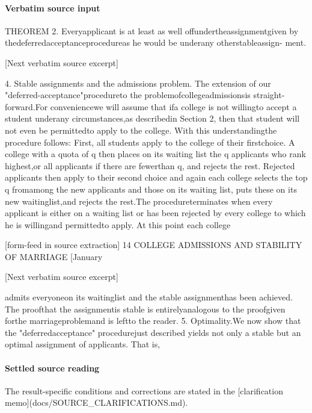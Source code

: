 \documentclass[10pt]{article}
\begin{document}
\paragraph{Verbatim source input}
\begin{ReviewVerbatim}
THEOREM 2. Everyapplicant is at least as well offundertheassignmentgiven
by thedeferredacceptanceprocedureas he would be underany otherstableassign-
ment.

[Next verbatim source excerpt]

    4. Stable assignments and the admissions problem. The extension of our
"deferred-acceptance"procedureto the problemofcollegeadmissionsis straight-
forward.For conveniencewe will assume that ifa college is not willingto accept
a student underany circumstances,as describedin Section 2, then that student
will not even be permittedto apply to the college. With this understandingthe
procedure follows: First, all students apply to the college of their firstchoice.
A college with a quota of q then places on its waiting list the q applicants who
rank highest,or all applicants if there are fewerthan q, and rejects the rest.
Rejected applicants then apply to their second choice and again each college
selects the top q fromamong the new applicants and those on its waiting list,
puts these on its new waitinglist,and rejects the rest.The procedureterminates
when every applicant is either on a waiting list or has been rejected by every
college to which he is willingand permittedto apply. At this point each college

[form-feed in source extraction]
14             COLLEGE ADMISSIONS AND STABILITY OF MARRIAGE              [January


[Next verbatim source excerpt]

admits everyoneon its waitinglist and the stable assignmenthas been achieved.
The proofthat the assignmentis stable is entirelyanalogous to the proofgiven
forthe marriageproblemand is leftto the reader.
   5. Optimality.We now show that the "deferredacceptance" procedurejust
described yields not only a stable but an optimal assignment of applicants.
That is,
\end{ReviewVerbatim}

\paragraph{Settled source reading}
The result-\allowbreak{}specific conditions and corrections are stated in the [clarification memo](docs/\allowbreak{}SOURCE\_\allowbreak{}CLARIFICATIONS.\allowbreak{}md).\allowbreak{}
\end{document}
